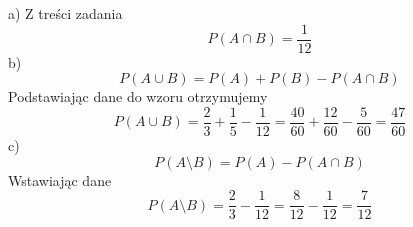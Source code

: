 \medskip
{} 
\medskip

a) Z treści zadania 
$$P({A}\cap{B})=\frac{1}{12}$$
b)$$P({A}\cup{B})=P(A)+P(B)-P({A}\cap{B})$$
Podstawiając dane do wzoru otrzymujemy
$$P({A}\cup{B})=\frac{2}{3}+\frac{1}{5}-\frac{1}{12}=\frac{40}{60}+\frac{12}{60}-\frac{5}{60}=\frac{47}{60}$$
c)$$P({A}\setminus{B})=P(A)-P({A}\cap{B})$$
Wstawiając dane
$$P({A}\setminus{B})=\frac{2}{3}-\frac{1}{12}=\frac{8}{12}-\frac{1}{12}=\frac{7}{12}$$
